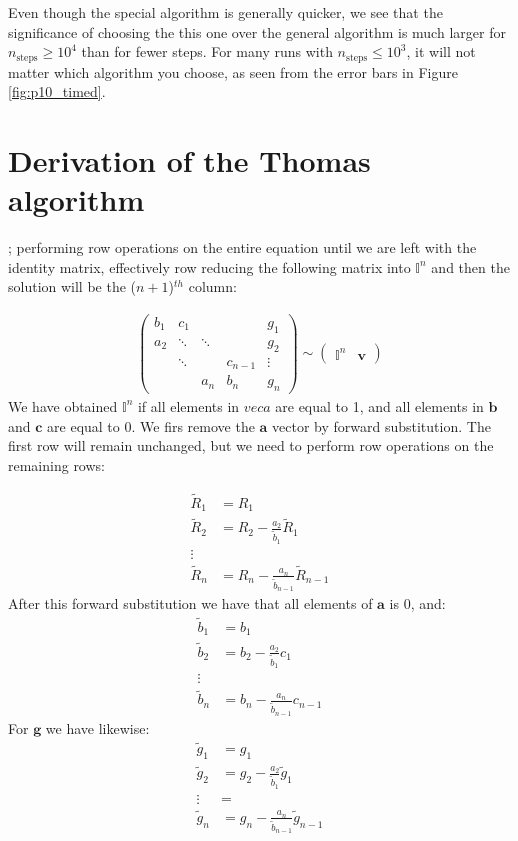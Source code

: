 \documentclass[english,notitlepage,nofootinbib]{revtex4-1}  %
\renewcommand{\vec}{\mathbf}
\newcommand{\Fig}[1]{Figure \ref{fig:#1}}
\begin{document}
Even though the special algorithm is generally quicker, we see that the significance of choosing the this one over the general algorithm is much larger for $n_\text{steps}\geq 10^4$ than for fewer steps. For many runs with $n_\text{steps}\leq10^3$, it will not matter which algorithm you choose, as seen from the error bars in \Fig{p10_timed}.

\appendix

\section{Derivation of the Thomas algorithm}\label{Apx:Thomas_algorithm}

; performing row operations on the entire equation until we are left with the identity matrix, effectively row reducing the following matrix into $\mathbb{I}^n$ and then the solution will be the ($n+1$)$^{th}$ column:


\begin{align*}
    \begin{pmatrix}
        b_1 & c_1 & &  & g_1 \\
        a_2 & \ddots & \ddots & & g_2 \\ 
         & \ddots & & c_{n-1} & \vdots \\
          & & a_n & b_n & g_n
    \end{pmatrix}
    \sim 
    \begin{pmatrix}
        \mathbb{I}^n & \vec{v}
    \end{pmatrix}
\end{align*}
We have obtained $\mathbb{I}^n$ if all elements in $vec{a}$ are equal to 1, and all elements in $\vec{b}$ and $\vec{c}$ are equal to 0. We firs remove the $\vec{a}$ vector by forward substitution. The first row will remain unchanged, but we need to perform row operations on the remaining rows:

\begin{align*}
    \tilde{R}_1 &= R_1 \\
    \tilde{R}_2 &= R_2 - \frac{a_2}{\tilde{b}_1}\tilde{R}_1\\
    \vdots & \\
    \tilde{R}_n &= R_n - \frac{a_n}{\tilde{b}_{n-1}}\tilde{R}_{n-1}
\end{align*}
After this forward substitution we have that all elements of $\vec{a}$ is 0, and:
\begin{align*}
    \tilde{b}_1 &= b_1 \\
    \tilde{b}_2 &= b_2 - \frac{a_2}{\tilde{b}_1} c_1 \\
    \vdots & \\
    \tilde{b}_n &= b_n - \frac{a_n}{\tilde{b}_{n-1}} c_{n-1}
\end{align*}
For $\vec{g}$ we have likewise:
\begin{align*}
    \tilde{g}_1 &= g_1 \\
    \tilde{g}_2 &= g_2 -  \frac{a_2}{\tilde{b}_1}\tilde{g}_1 \\
    \vdots &= \\
    \tilde{g}_n &= g_n - \frac{a_n}{\tilde{b}_{n-1}}\tilde{g}_{n-1}
\end{align*}
\end{document}
